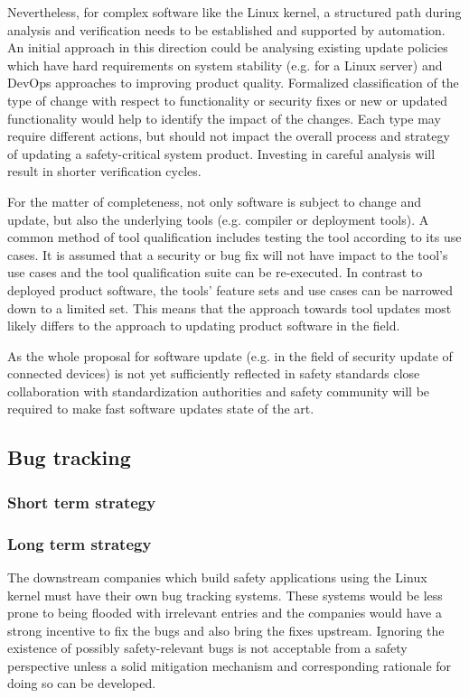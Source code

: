 \documentclass[12pt]{../Common_files/ElisaPaper}
\begin{document}
Nevertheless, for complex software like the Linux kernel,
a structured path during analysis and verification 
needs to be established and supported by automation.
An initial approach in this direction
could be analysing existing update policies 
which have hard requirements on system stability (e.g. for a Linux server) 
and DevOps approaches to improving product quality. 
Formalized classification of the type of change  
with respect to functionality or security fixes or new or updated functionality 
would help to identify the impact of the changes.
Each type may require different actions, 
but should not impact the overall process and strategy of updating a safety-critical system product. 
Investing in careful analysis will result in shorter verification cycles.
 
For the matter of completeness, not only software is subject to change and update, but also the underlying tools (e.g. compiler or deployment tools). 
A common method of tool qualification includes testing the tool according to its use cases. 
It is assumed that a security or bug fix will not have impact to the tool's use cases and 
the tool qualification suite can be re-executed. 
In contrast to deployed product software, 
the tools' feature sets and use cases can be narrowed down to a limited set. 
This means that the approach towards tool updates most likely differs to the approach to updating product software in the field.

As the whole proposal for software update (e.g. in the field of security update of connected devices) 
is not yet sufficiently reflected in safety standards 
close collaboration with standardization authorities and safety community 
will be required to make fast software updates state of the art.
\subsection{Bug tracking}

\subsubsection{Short term strategy}

\subsubsection{Long term strategy}
The downstream companies which build safety applications using the Linux kernel must have their own bug tracking systems.
These systems would be less prone to being flooded with irrelevant entries and 
the companies would have a strong incentive to fix the bugs and also bring the fixes upstream. 
Ignoring the existence of possibly safety-relevant bugs is not acceptable from a safety perspective 
unless a solid mitigation mechanism and corresponding rationale for doing so can be developed.
\end{document}
